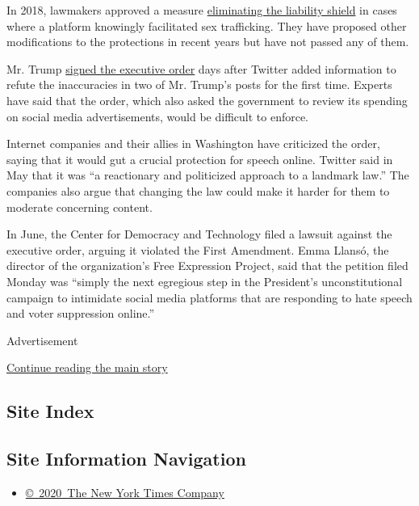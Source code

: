In 2018, lawmakers approved a measure
\href{https://www.nytimes.com/2019/12/17/technology/fosta-sex-trafficking-law.html}{eliminating
the liability shield} in cases where a platform knowingly facilitated
sex trafficking. They have proposed other modifications to the
protections in recent years but have not passed any of them.

Mr. Trump
\href{https://www.nytimes.com/2020/05/28/us/politics/trump-order-social-media.html}{signed
the executive order} days after Twitter added information to refute the
inaccuracies in two of Mr. Trump's posts for the first time. Experts
have said that the order, which also asked the government to review its
spending on social media advertisements, would be difficult to enforce.

Internet companies and their allies in Washington have criticized the
order, saying that it would gut a crucial protection for speech online.
Twitter said in May that it was ``a reactionary and politicized approach
to a landmark law.'' The companies also argue that changing the law
could make it harder for them to moderate concerning content.

In June, the Center for Democracy and Technology filed a lawsuit against
the executive order, arguing it violated the First Amendment. Emma
Llansó, the director of the organization's Free Expression Project, said
that the petition filed Monday was ``simply the next egregious step in
the President's unconstitutional campaign to intimidate social media
platforms that are responding to hate speech and voter suppression
online.''

Advertisement

\protect\hyperlink{after-bottom}{Continue reading the main story}

\hypertarget{site-index}{%
\subsection{Site Index}\label{site-index}}

\hypertarget{site-information-navigation}{%
\subsection{Site Information
Navigation}\label{site-information-navigation}}

\begin{itemize}
\tightlist
\item
  \href{https://help.nytimes.com/hc/en-us/articles/115014792127-Copyright-notice}{©~2020~The
  New York Times Company}
\end{itemize}

